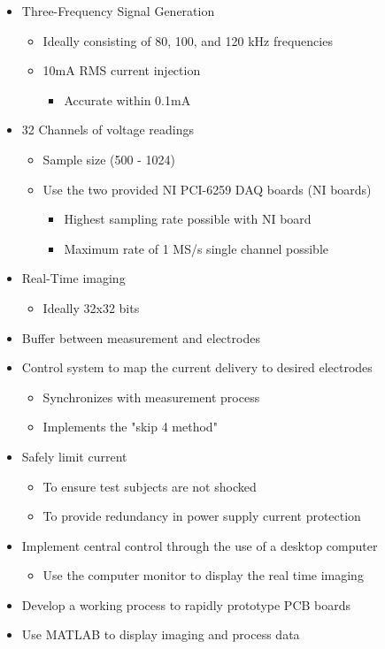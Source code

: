 \documentclass[12pt]{article}
\begin{document}
\begin{itemize}
    \item Three-Frequency Signal Generation
    \begin{itemize}
    \item Ideally consisting of 80, 100, and 120 kHz frequencies
    \item 10mA RMS current injection
        \begin{itemize}
            \item Accurate within 0.1mA
        \end{itemize}
    \end{itemize}
    \item 32 Channels of voltage readings
    \begin{itemize}
        \item Sample size (500 - 1024)
        \item Use the two provided NI PCI-6259 DAQ boards (NI boards)
        \begin{itemize}
            \item Highest sampling rate possible with NI board
            \item Maximum rate of 1 MS/s single channel possible
        \end{itemize}
    \end{itemize}
    \item Real-Time imaging
    \begin{itemize}
        \item Ideally 32x32 bits
    \end{itemize}
    \item Buffer between measurement and electrodes
    \item Control system to map the current delivery to desired electrodes
    \begin{itemize}
        \item Synchronizes with measurement process
        \item Implements the "skip 4 method"
    \end{itemize}
    \item Safely limit current
    \begin{itemize}
        \item To ensure test subjects are not shocked
        \item To provide redundancy in power supply current protection
    \end{itemize}
    \item Implement central control through the use of a desktop computer

    \begin{itemize}
        \item Use the computer monitor to display the real time imaging
    \end{itemize}
    \item Develop a working process to rapidly prototype PCB boards
    \item Use MATLAB to display imaging and process data
\end{itemize}
\end{document}
